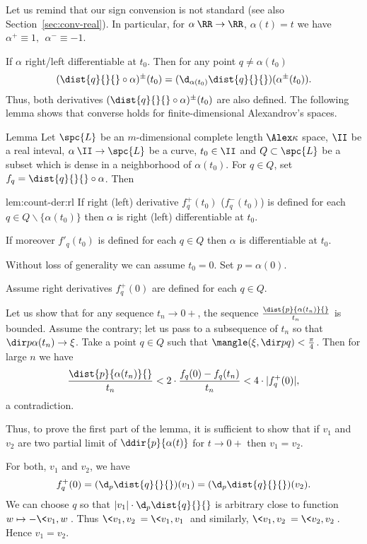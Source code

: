 Let us remind that our sign convension is not standard (see also Section~\ref{sec:conv-real}). 
In particular, for $\alpha\:\RR\to \RR$, $\alpha(t)=t$ we have $\alpha^+\equiv 1,\ \ \alpha^-\equiv -1$.

If $\alpha$ right/left differentiable at $t_0$.
Then for any point $q\not=\alpha(t_0)$
\[(\dist{q}{}{}\circ\alpha)^\pm(t_0)
=
(\d_{\alpha(t_0)}\dist{q}{}{})(\alpha^\pm(t_0)).\]
Thus, both derivatives $(\dist{q}{}{}\circ\alpha)^\pm(t_0)$ are also defined.
The following lemma shows that converse holds for finite-dimensional Alexandrov's spaces.


\begin{thm}{Lemma}\label{lem:count-der}
Let $\spc{L}$ be an $m$-dimensional complete length $\Alex\kappa$ space,
$\II$ be a real inteval,
$\alpha\:\II\to \spc{L}$ be a curve,
$t_0\in\II$ 
and $Q\subset \spc{L}$ be a subset which is dense in a neighborhood of $\alpha(t_0)$.
For $q\in Q$, set $f_q=\dist{q}{}{}\circ\alpha$.
Then 
\begin{subthm}{lem:count-der:rl}
If right (left) derivative $f^+_q(t_0)$ ($f^-_q(t_0)$) is defined for each $q\in Q\backslash \{\alpha(t_0)\}$ then $\alpha$ is right (left) differentiable at $t_0$.
\end{subthm}

\begin{subthm}{} If moreover $f'_q(t_0)$ is defined for each $q\in Q$ then $\alpha$ is differentiable at $t_0$.
\end{subthm}
\end{thm}



Without loss of generality we can assume $t_0=0$. Set $p=\alpha(0)$.

Assume right derivatives $f^+_q(0)$ are defined for each $q\in Q$.

Let us show that for any sequence $t_n\to 0+$, the sequence $\frac{\dist{p}{\alpha(t_n)}{}}{t_n}$ is bounded.
Assume the contrary;
let us pass to a subsequence of $t_n$ so that $\dir p{\alpha(t_n)}\to\xi$.
Take a point $q\in Q$ such that $\mangle(\xi,\dir p q)<\tfrac\pi4$.
Then for large $n$ we have 
\[\frac{\dist{p}{\alpha(t_n)}{}}{t_n}
<
2\cdot\frac{f_q(0)-f_q(t_n)}{t_n}
<
4\cdot|f^+_q(0)|,\] a 
contradiction.

Thus, to prove the first part of the lemma, 
it is sufficient to show that if $v_1$ and $v_2$ are two partial limit of $\ddir{p}{\alpha(t)}$ for $t\to 0+$ then $v_1=v_2$.

For both, $v_1$ and $v_2$, we have
\[f_q^+(0)=(\d_p\dist{q}{}{})(v_1)=(\d_p\dist{q}{}{})(v_2).\]
We can choose $q$ so that $|v_1|\cdot\d_p\dist{q}{}{}$ is arbitrary close to function $w\mapsto -\<v_1,w\>$.
Thus $\<v_1,v_2\>=\<v_1,v_1\>$ and similarly, $\<v_1,v_2\>=\<v_2,v_2\>$. 
Hence $v_1=v_2$.
\qeds

